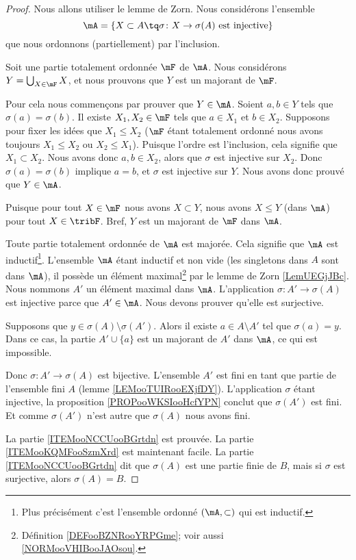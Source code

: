 \begin{proof}
	Nous allons utiliser le lemme de Zorn. Nous considérons l'ensemble
	\begin{equation}
		\mA=\{ X\subset A\tq \sigma\colon X\to \sigma(A) \text{ est injective} \}
	\end{equation}
	que nous ordonnons (partiellement) par l'inclusion.
	\begin{subproof}
		Soit une partie totalement ordonnée \( \mF\) de \( \mA\). Nous considérons \( Y=\bigcup_{X\in \mF}X\), et nous prouvons que \( Y\) est un majorant de \( \mF\).

		Pour cela nous commençons par prouver que \( Y\in \mA\). Soient \( a,b\in Y\) tels que \( \sigma(a)=\sigma(b)\). Il existe \( X_1,X_2\in \mF\) tels que \( a\in X_1\) et \( b\in X_2\). Supposons pour fixer les idées que \( X_1\leq X_2\) (\( \mF\) étant totalement ordonné nous avons toujours \( X_1\leq X_2\) ou \( X_2\leq X_1\)). Puisque l'ordre est l'inclusion, cela signifie que \( X_1\subset X_2\). Nous avons donc \( a,b\in X_2\), alors que \( \sigma\) est injective sur \( X_2\). Donc \(\sigma(a)=\sigma(b)\) implique \( a=b\), et \( \sigma\) est injective sur \( Y\). Nous avons donc prouvé que \( Y\in \mA\).

		Puisque pour tout \( X\in\mF\) nous avons \( X\subset Y\), nous avons \( X\leq Y\) (dans \( \mA\)) pour tout \( X\in \tribF\). Bref, \( Y\) est un majorant de \( \mF\) dans \( \mA\).

		Toute partie totalement ordonnée de \( \mA\) est majorée. Cela signifie que \( \mA\) est inductif\footnote{Plus précisément c'est l'ensemble ordonné \( (\mA,\subset)\) qui est inductif.}.
		\spitem[Zorn]
		L'ensemble \( \mA\) étant inductif et non vide (les singletons dans \( A\) sont dans \( \mA\)), il possède un élément maximal\footnote{Définition \ref{DEFooBZNRooYRPGme}; voir aussi \ref{NORMooVHIBooJAOsou}.} par le lemme de Zorn \ref{LemUEGjJBc}. Nous nommons \( A'\) un élément maximal dans \( \mA\).
		\spitem[Bijective]
		L'application \( \sigma\colon A'\to \sigma(A)\) est injective parce que \( A'\in \mA\). Nous devons prouver qu'elle est surjective.

		Supposons que \( y\in\sigma(A)\setminus\sigma(A')\). Alors il existe \( a\in A\setminus A'\) tel que \( \sigma(a)=y\). Dans ce cas, la partie \( A'\cup\{ a \}\) est un majorant de \( A'\) dans \( \mA\), ce qui est impossible.

		Donc \( \sigma\colon A'\to \sigma(A)\) est bijective.
		\spitem[Conclusion]
		L'ensemble \( A'\) est fini en tant que partie de l'ensemble fini \( A\) (lemme \ref{LEMooTUIRooEXjfDY}). L'application \( \sigma\) étant injective, la proposition \ref{PROPooWKSIooHcfYPN} conclut que \( \sigma(A')\) est fini. Et comme \( \sigma(A')\) n'est autre que \( \sigma(A)\) nous avons fini.
	\end{subproof}
	La partie \ref{ITEMooNCCUooBGrtdn} est prouvée. La partie \ref{ITEMooKQMFooSzmXrd} est maintenant facile. La partie \ref{ITEMooNCCUooBGrtdn} dit que \( \sigma(A)\) est une partie finie de \( B\), mais si \( \sigma\) est surjective, alors \( \sigma(A)=B\).
\end{proof}

